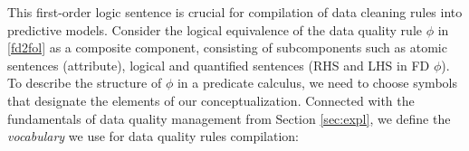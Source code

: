 This first-order logic sentence is crucial for compilation of data cleaning rules into predictive models. %
Consider the logical equivalence of the data quality rule $\phi$ in \ref{fd2fol} as a composite component, consisting of subcomponents such as atomic sentences (attribute), logical and quantified sentences (RHS and LHS in FD $\phi$). To describe the structure of $\phi$ in a predicate calculus, we need to choose symbols that designate the elements of our conceptualization. Connected with the fundamentals of data quality management from Section \ref{sec:expl}, we define the \textit{vocabulary} we use for data quality rules compilation: 

